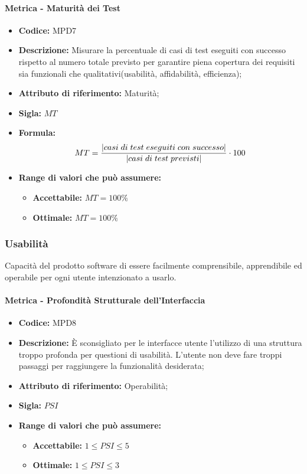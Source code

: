 \paragraph{Metrica - Maturità dei Test} 
\begin{itemize}
    \item \textbf{Codice:} MPD7
    \item \textbf{Descrizione:} Misurare la percentuale di casi di test eseguiti con successo rispetto al numero totale previsto per garantire piena copertura dei requisiti sia funzionali che qualitativi(usabilità, affidabilità, efficienza);
    \item \textbf{Attributo di riferimento:} Maturità;
    \item \textbf{Sigla:} $MT$
    \item \textbf{Formula:} $$MT = {|casi \; di \; test \; eseguiti \; con \; successo| \over |casi \; di \; test \; previsti|} \cdot 100$$
    \item \textbf{Range di valori che può assumere:}
    \begin{itemize}
        \item \textbf{Accettabile:} $MT = 100\% $
        \item \textbf{Ottimale:} $MT = 100\% $
    \end{itemize}
\end{itemize}
       
\subsubsection{Usabilità}
Capacità del prodotto software di essere facilmente comprensibile, apprendibile ed operabile per ogni utente intenzionato a usarlo.

\paragraph{Metrica - Profondità Strutturale dell'Interfaccia}
\begin{itemize}
    \item \textbf{Codice:} MPD8
    \item \textbf{Descrizione:} È sconsigliato per le interfacce utente l'utilizzo di una struttura troppo profonda per questioni di usabilità. L'utente non deve fare troppi passaggi per raggiungere la funzionalità desiderata;
    \item \textbf{Attributo di riferimento:} Operabilità;
    \item \textbf{Sigla:} $PSI$
    \item \textbf{Range di valori che può assumere:}
    \begin{itemize}
        \item \textbf{Accettabile:} $1 \leq PSI \leq 5$
        \item \textbf{Ottimale:} $1 \leq PSI \leq 3$
    \end{itemize}
\end{itemize}

